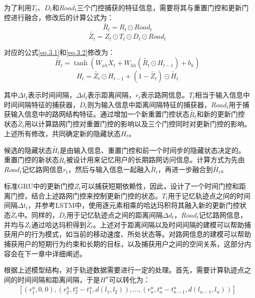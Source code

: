 \documentclass[master]{thesis-uestc}
\begin{document}
为了利用$T_t$、$D_t$和$Road_t$三个门控捕获的特征信息，需要将其与重置门控和更新门控进行融合，修改后的计算公式为：
\begin{equation}
  \tilde{R_t} = R_t \odot Road_t
\end{equation}
\begin{equation}
  \tilde{Z_t} = Z_t \odot T_t \odot D_t \odot Road_t
\end{equation}

对应的公式\ref{eq.3.1}和\ref{eq.3.2}修改为：
\begin{equation}
  \tilde{H_t} = \tanh(W_{xh}X_t + W_{hh}(\tilde{R_t} \odot H_{t-1})+b_h)
\label{eq.3.3}
\end{equation}
\begin{equation}
  H_t = \tilde{Z_t}\odot H_{t-1}+(1-\tilde{Z_t})\odot \tilde{H_t}
\label{eq.3.4}
\end{equation}

其中$\Delta t_t$表示时间间隔，$\Delta d_t$表示距离间隔，$r_t$表示路网信息。$T_t$相当于输入信息中时间间隔特征的捕获器，$D_t$则为输入信息中距离间隔特征的捕获器，$Road_t$用于捕获输入信息中的路网结构特征。通过增加一个新重置门控状态$\tilde{R_t}$和新的更新门控状态$\tilde{Z_t}$用以计算路网门控对重置门控的影响以及三个门控同时对更新门控的影响。上述所有修改，共同确定新的隐藏状态$H_t$。

候选的隐藏状态$\tilde{H_t}$是由输入信息、重置门控和前一个时间步的隐藏状态决定的。重置门控的新状态$\tilde{R_t}$被设计用来记忆用户的长期路网访问信息。计算方式为先由$Road_t$记忆路网信息$r_t$，然后与输入信息一起融入$\tilde{R_t}$，再进一步融合到$\tilde{H_t}$。

标准GRU中的更新门控$Z_t$可以捕获短期依赖性，因此，设计了一个时间门控和距离门控，结合上述路网门控来控制更新门控的状态。$T_t$用于记忆轨迹点之间的时间间隔$\Delta t_t$，并参考LSTM中，使用逐元素相乘的哈达玛积将其融入新的更新门控状态$\tilde{Z_t}$中。同样的，$D_t$用于记忆轨迹点之间的距离间隔$\Delta d_t$，$Road_t$记忆路网信息，并均与$Z_t$通过哈达玛积得到$\tilde{Z_t}$。上述对于距离间隔以及时间间隔的建模可以帮助捕获用户的行为模式，如当前的移动速度、所处状态等。对路网信息的建模可以帮助捕获用户的短期行为约束和长期的目标，以及捕获用户之间的空间关系，这部分内容会在下一章中详细阐述。

根据上述模型结构，对于轨迹数据需要进行一定的处理。首先，需要计算轨迹点之间的时间间隔和距离间隔，于是$H^u$可以转化为：
\begin{equation}
\begin{split}
  [(r^u_1,0,0),(r^u_2,t^u_2-t^u_1,d (l_1,l_2)),\dots,
  (r^u_n,t^u_n-t^u_{n-1},d(l_{n-1},l_n))]
\end{split}
\end{equation}
\end{document}
